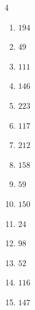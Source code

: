 \begin{multicols}{4}
\begin{enumerate}

  \item $194$


  \item $49$


  \item $111$


  \item $146$


  \item $223$


  \item $117$


  \item $212$


  \item $158$


  \item $59$


  \item $150$


  \item $24$


  \item $98$


  \item $52$


\columnbreak %

\resetques

  \item $116$


  \item $147$


\end{enumerate}
\end{multicols}
